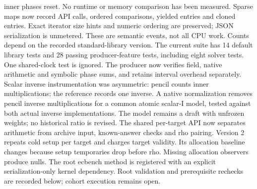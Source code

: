 \documentclass[11pt]{article}
\begin{document}
inner phases reset. No runtime or memory comparison has been measured.
Sparse maps now record API calls, ordered comparisons, yielded entries and
cloned entries. Exact iterator size hints and numeric ordering are preserved;
JSON serialization is unmetered. These are semantic events, not all CPU work.
Counts depend on the recorded standard-library version. The current suite has
14 default library tests and 28 passing producer-feature tests, including eight solver tests. One shared-clock test is ignored.
The producer now verifies field, native arithmetic and symbolic phase sums,
and retains interval overhead separately. Scalar inverse instrumentation was
asymmetric: pencil counts inner multiplications; the reference records one
inverse. A native normalization removes pencil inverse multiplications for a
common atomic scalar-I model, tested against both actual inverse implementations.
The model remains a draft with unfrozen weights; no historical ratio is revised.
The shared per-target API now separates arithmetic from archive input,
known-answer checks and rho pairing. Version 2 repeats cold setup per target
and charges target validity. Its allocation baseline changes because setup
temporaries drop before rho. Missing allocation observers produce nulls.
The root ecbench method is registered with an explicit serialization-only
kernel dependency. Root validation and prerequisite rechecks are recorded below; cohort execution remains open.
\end{document}
